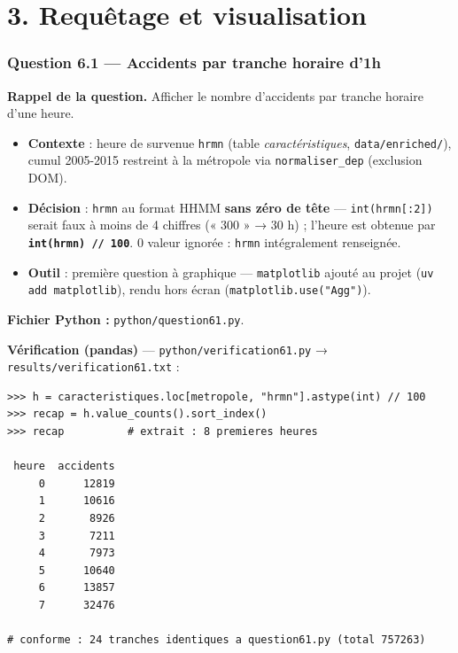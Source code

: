 \documentclass[11pt,a4paper]{article}
\newcommand{\rub}[2]{\textbf{\textcolor{#1}{#2}}}
\begin{document}
\section*{3. Requêtage et visualisation}

\subsubsection*{Question 6.1 — Accidents par tranche horaire d'1h}

\rub{labrappel}{Rappel de la question.} Afficher le nombre d'accidents par tranche horaire d'une heure.

\begin{agentbox}
\begin{itemize}
\item \textbf{Contexte} : heure de survenue \texttt{hrmn} (table \emph{caractéristiques}, \texttt{data/enriched/}), cumul 2005-2015 restreint à la métropole via \texttt{normaliser\_dep} (exclusion DOM).
\item \textbf{Décision} : \texttt{hrmn} au format HHMM \textbf{sans zéro de tête} — \texttt{int(hrmn[:2])} serait faux à moins de 4 chiffres (« 300 » → 30 h) ; l'heure est obtenue par \textbf{\texttt{int(hrmn) // 100}}. 0 valeur ignorée : \texttt{hrmn} intégralement renseignée.
\item \textbf{Outil} : première question à graphique — \texttt{matplotlib} ajouté au projet (\texttt{uv add matplotlib}), rendu hors écran (\texttt{matplotlib.use("Agg")}).
\end{itemize}
\end{agentbox}

\rub{labfichier}{Fichier Python :} \texttt{python/question61.py}.

\rub{labverif}{Vérification (pandas)} --- \texttt{python/verification61.py} → \texttt{results/verification61.txt} :

\begin{lstlisting}[style=pyblock]
>>> h = caracteristiques.loc[metropole, "hrmn"].astype(int) // 100
>>> recap = h.value_counts().sort_index()
>>> recap          # extrait : 8 premieres heures

 heure  accidents
     0      12819
     1      10616
     2       8926
     3       7211
     4       7973
     5      10640
     6      13857
     7      32476

# conforme : 24 tranches identiques a question61.py (total 757263)
\end{lstlisting}
\end{document}
